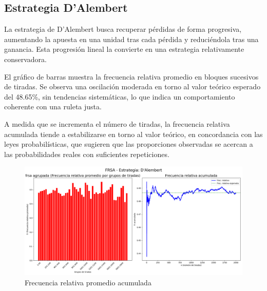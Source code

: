 \documentclass{article}
\begin{document}
\subsection{Estrategia D'Alembert}
La estrategia de D'Alembert busca recuperar pérdidas de forma progresiva, aumentando la apuesta en una unidad tras cada pérdida y reduciéndola tras una ganancia. Esta progresión lineal la convierte en una estrategia relativamente conservadora.

El gráfico de barras muestra la frecuencia relativa promedio en bloques sucesivos de tiradas. Se observa una oscilación moderada en torno al valor teórico esperado del 48.65\%, sin tendencias sistemáticas, lo que indica un comportamiento coherente con una ruleta justa.

A medida que se incrementa el número de tiradas, la frecuencia relativa acumulada tiende a estabilizarse en torno al valor teórico, en concordancia con las leyes probabilísticas, que sugieren que las proporciones observadas se acercan a las probabilidades reales con suficientes repeticiones.
\begin{figure}[H]
    \centering
    \includegraphics[width=1\textwidth]{Imagenes/frsa_D'Alembert.png}
    \caption{Frecuencia relativa promedio acumulada}
    \label{fig:dal_frsa}
\end{figure}
\end{document}

